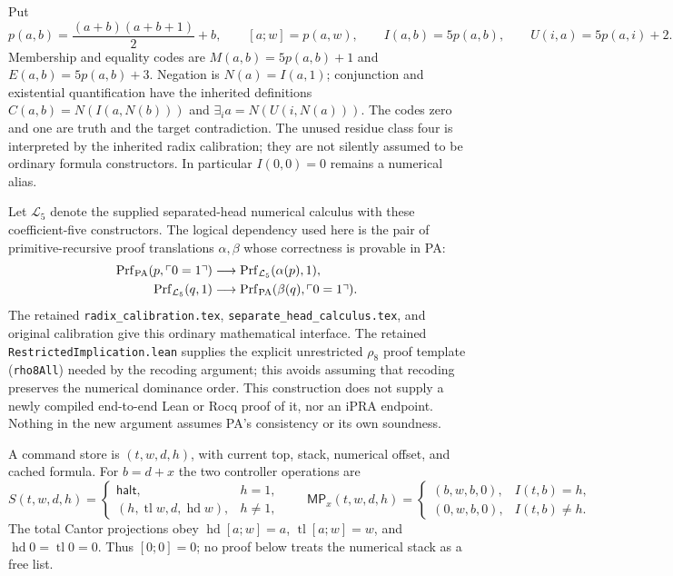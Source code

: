 Put
\[
 p(a,b)=\frac{(a+b)(a+b+1)}2+b,\qquad [a;w]=p(a,w),\qquad
 I(a,b)=5p(a,b),\qquad U(i,a)=5p(a,i)+2.
\]
Membership and equality codes are $M(a,b)=5p(a,b)+1$ and
$E(a,b)=5p(a,b)+3$.  Negation is $N(a)=I(a,1)$; conjunction and existential
quantification have the inherited definitions
$C(a,b)=N(I(a,N(b)))$ and $\exists_i a=N(U(i,N(a)))$.
The codes zero and one are truth and the target contradiction.
The unused residue class four is interpreted by the inherited
radix calibration; they are not silently assumed to be ordinary formula
constructors.  In particular $I(0,0)=0$ remains a numerical alias.

Let $\mathcal L_5$ denote the supplied separated-head numerical calculus
with these coefficient-five constructors.  The logical dependency used here
is the pair of primitive-recursive proof translations $\alpha,\beta$ whose
correctness is provable in PA:
\begin{align*}
 \operatorname{Prf}_{\rm PA}(p,\ulcorner0=1\urcorner)
     &\longrightarrow \operatorname{Prf}_{\mathcal L_5}(\alpha(p),1),\\
 \operatorname{Prf}_{\mathcal L_5}(q,1)
     &\longrightarrow \operatorname{Prf}_{\rm PA}(\beta(q),\ulcorner0=1\urcorner).
\end{align*}
The retained \texttt{radix\_calibration.tex},
\texttt{separate\_head\_calculus.tex}, and original calibration give this
ordinary mathematical interface.  The retained
\texttt{RestrictedImplication.lean} supplies the explicit unrestricted
$\rho_8$ proof template (\texttt{rho8All}) needed by the recoding argument;
this avoids assuming that recoding preserves the numerical dominance order.
This construction does not supply a newly
compiled end-to-end Lean or Rocq proof of it, nor an iPRA endpoint.
Nothing in the new argument assumes PA's consistency or its own soundness.

A command store is $(t,w,d,h)$, with current top, stack, numerical offset,
and cached formula.  For $b=d+x$ the two controller operations are
\[
 S(t,w,d,h)=\begin{cases}
 \mathsf{halt},&h=1,\\
 (h,\operatorname{tl}w,d,\operatorname{hd}w),&h\ne1,
 \end{cases}
 \qquad
 \mathsf{MP}_{x}(t,w,d,h)=\begin{cases}
 (b,w,b,0),&I(t,b)=h,\\
 (0,w,b,0),&I(t,b)\ne h.
 \end{cases}
\]
The total Cantor projections obey
$\operatorname{hd}[a;w]=a$, $\operatorname{tl}[a;w]=w$, and
$\operatorname{hd}0=\operatorname{tl}0=0$.  Thus $[0;0]=0$; no proof below
treats the numerical stack as a free list.

